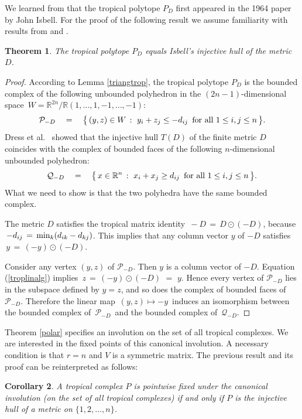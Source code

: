 \documentclass[11pt]{amsart}
\newtheorem{thm}{Theorem}
\newtheorem{cor}[thm]{Corollary}
\newcommand{\RR}{\mathbb{R}}
\begin{document}
We learned from  \cite{DMT} that the tropical polytope $P_D$
first appeared in the 1964 paper \cite{Isb} by John Isbell. 
For the proof of the following result
we assume familiarity with results from
 \cite{DHM} and \cite{DMT}.

\begin{thm} The tropical polytope $P_D$ equals 
Isbell's injective hull of the metric $D$. 
\end{thm}

\begin{proof}
According to Lemma \ref{triangtrop},
the tropical polytope $P_D$ is the bounded complex of
the following unbounded polyhedron in  the 
$(2n-1)$-dimensional space $\,W = \RR^{2n}/ \RR(1,\ldots,1,-1,\ldots,-1)$:
$$
{\mathcal P}_{-D} \quad = \quad
\bigl\{\, (y,z) \in W \,:\,\, y_i + z_j \leq - d_{ij} \,\,\,
\hbox{for all} \,\, 1 \leq i,j \leq n \, \bigr\}.
$$
Dress et al.~\cite{DHM} showed that 
the injective hull $T(D)$ of the finite metric $D$
coincides with the complex of bounded faces of
the following $n$-dimensional unbounded polyhedron:
$$
{\mathcal Q}_{-D} \quad = \quad
\bigl\{\, x \in \RR^n \,:\,\, x_i + x_j \geq d_{ij} \,\,\,
\hbox{for all} \,\, 1 \leq i,j \leq n \, \bigr\}.
$$
What we need to show is that the two polyhedra
have the same bounded complex.

The metric $D$ satisfies the tropical
matrix identity $\,-D \, = \, D \odot (-D) $, because
$\, - d_{ij} \, = \, {\rm min}_k (d_{ik} - d_{kj})$.
This implies that any column vector $y$ of $-D$
satisfies $\, y \, = \,  (-y) \odot (-D) $.


Consider any vertex $(y,z)$ of ${\mathcal P}_{-D}$.
Then $y$ is a column vector of $-D$.
Equation (\ref{troplinalg}) implies
$\,z \, = \, (-y) \odot (-D) \,\, = \, \, y$.
Hence  every vertex of ${\mathcal P}_{-D}$
lies in the subspace defined by $y=z$, and 
so does the complex of bounded faces of
${\mathcal P}_{-D}$. Therefore the linear map
$\,(y,z) \mapsto - y \,$ induces
an isomorphism between the bounded
complex of $\,{\mathcal P}_{-D} \,$
and the bounded complex of
$\,{\mathcal Q}_{-D} $.
\end{proof}

Theorem \ref{polar} specifies an involution on the
set of all tropical complexes. We are interested
in the fixed points of this canonical involution.
A necessary condition is that $r=n$ and 
$V$ is a symmetric matrix. 
The previous result and its proof
can be reinterpreted as follows:

\begin{cor} A tropical complex $P$ is
pointwise fixed under the canonical involution
(on the set of all tropical complexes)
if and only if $P$ is the injective hull of
a metric on $\{1,2,\ldots,n\}$.
\end{cor}
\end{document}
